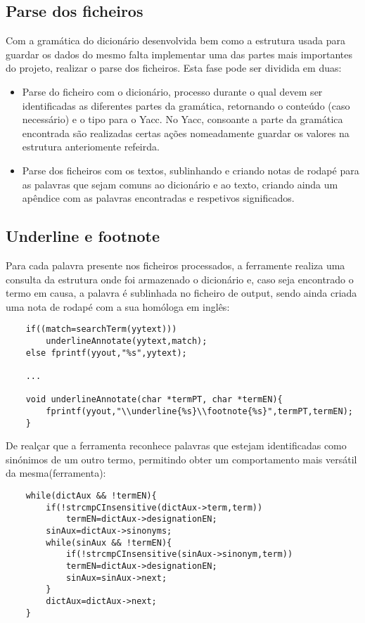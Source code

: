 \documentclass{llncs}
\begin{document}
\subsection{Parse dos ficheiros}
Com a gramática do dicionário desenvolvida bem como a estrutura usada para guardar os dados do mesmo falta implementar uma das partes mais importantes do projeto, realizar o parse dos ficheiros. Esta fase pode ser dividida em duas:
\begin{itemize}
\item Parse do ficheiro com o dicionário, processo durante o qual devem ser identificadas as diferentes partes da gramática, retornando o conteúdo (caso necessário) e o tipo para o Yacc. No Yacc, consoante a parte da gramática encontrada são realizadas certas ações nomeadamente guardar os valores na estrutura anteriomente refeirda.
\item Parse dos ficheiros com os textos, sublinhando e criando notas de rodapé para as palavras que sejam comuns ao dicionário e ao texto, criando ainda um apêndice com as palavras encontradas e respetivos significados.
\end{itemize}

\subsection{Underline e footnote}
Para cada palavra presente nos ficheiros processados, a ferramente realiza uma consulta da estrutura onde foi armazenado o dicionário e, caso seja encontrado o termo em causa, a palavra é sublinhada no ficheiro de output, sendo ainda criada uma nota de rodapé com a sua homóloga em inglês: 
\begin{verbatim}
    if((match=searchTerm(yytext)))
        underlineAnnotate(yytext,match);          
    else fprintf(yyout,"%s",yytext);

    ...

    void underlineAnnotate(char *termPT, char *termEN){
        fprintf(yyout,"\\underline{%s}\\footnote{%s}",termPT,termEN);
    }
\end{verbatim}

De realçar que a ferramenta reconhece palavras que estejam identificadas como sinónimos de um outro termo, permitindo obter um comportamento mais versátil da mesma(ferramenta): 
\begin{verbatim}
    while(dictAux && !termEN){ 
        if(!strcmpCInsensitive(dictAux->term,term))
            termEN=dictAux->designationEN;
        sinAux=dictAux->sinonyms;
        while(sinAux && !termEN){
            if(!strcmpCInsensitive(sinAux->sinonym,term))
            termEN=dictAux->designationEN;
            sinAux=sinAux->next;
        }
        dictAux=dictAux->next;
    }
\end{verbatim}
\end{document}
